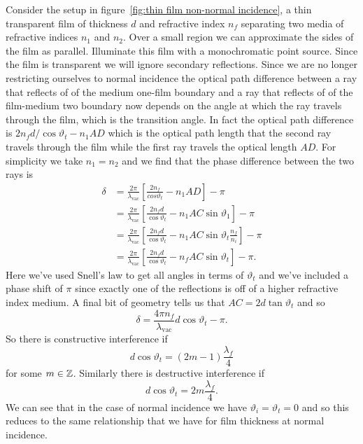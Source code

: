     Consider the setup in figure~\ref{fig:thin film non-normal incidence}, a thin transparent film of thickness \(d\) and refractive index \(n_f\) separating two media of refractive indices \(n_1\) and \(n_2\).
    Over a small region we can approximate the sides of the film as parallel.
    Illuminate this film with a monochromatic point source.
    Since the film is transparent we will ignore secondary reflections.
    Since we are no longer restricting ourselves to normal incidence the optical path difference between a ray that reflects of of the medium one-film boundary and a ray that reflects of of the film-medium two boundary now depends on the angle at which the ray travels through the film, which is the transition angle.
    In fact the optical path difference is \(2n_f d/\cos\vartheta_t - n_1AD\) which is the optical path length that the second ray travels through the film while the first ray travels the optical length \(AD\).
    For simplicity we take \(n_1 = n_2\) and we find that the phase difference between the two rays is
    \begin{align*}
        \delta &= \frac{2\pi}{\lambda_{\mathrm{vac}}} \left[ \frac{2n_f}{cos
        \vartheta_t} - n_1AD \right] - \pi\\
        &= \frac{2\pi}{\lambda_{\mathrm{vac}}} \left[ \frac{2n_fd}{\cos\vartheta_t} - n_1AC\sin\vartheta_1 \right] - \pi\\
        &= \frac{2\pi}{\lambda_{\mathrm{vac}}} \left[ \frac{2n_fd}{\cos\vartheta_t} - n_1AC\sin\vartheta_t\frac{n_f}{n_i} \right] - \pi\\
        &= \frac{2\pi}{\lambda_{\mathrm{vac}}} \left[ \frac{2n_fd}{\cos\vartheta_t} - n_fAC\sin\vartheta_t \right] - \pi.
    \end{align*}
    Here we've used Snell's law to get all angles in terms of \(\vartheta_t\) and we've included a phase shift of \(\pi\) since exactly one of the reflections is off of a higher refractive index medium.
    A final bit of geometry tells us that \(AC = 2d\tan\vartheta_t\) and so
    \[\delta = \frac{4\pi n_f}{\lambda_{\mathrm{vac}}}d\cos\vartheta_t - \pi.\]
    So there is constructive interference if
    \[d\cos\vartheta_t = (2m - 1)\frac{\lambda_f}{4}\]
    for some \(m\in\mathbb{Z}\).
    Similarly there is destructive interference if
    \[d\cos\vartheta_t = 2m\frac{\lambda_f}{4}.\]
    We can see that in the case of normal incidence we have \(\vartheta_i = \vartheta_t = 0\) and so this reduces to the same relationship that we have for film thickness at normal incidence.
    
